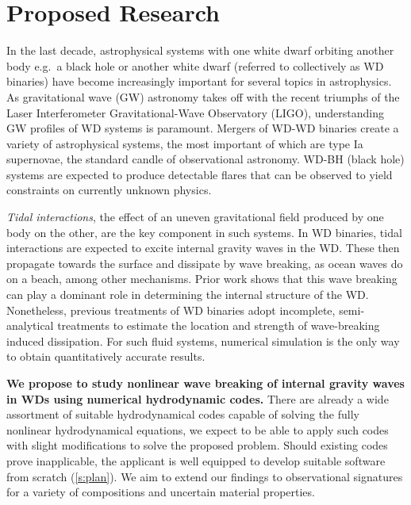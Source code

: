 \documentclass[12pt,
        usenames, %
        dvipsnames %
    ]{article}
\begin{document}
\def\Snospace~{\S{}} %
\renewcommand*{\sectionautorefname}{\Snospace}
\renewcommand*{\appendixautorefname}{\Snospace}
\renewcommand*{\figureautorefname}{Fig.}
\renewcommand*{\equationautorefname}{Eq.}
\renewcommand*{\tableautorefname}{Tab.}

\doublespacing


\section{Proposed Research}

In the last decade, astrophysical systems with one white dwarf orbiting another
body e.g.\ a black hole or another white dwarf (referred to collectively as WD
binaries) have become increasingly important for several topics in astrophysics.
As gravitational wave (GW) astronomy takes off with the recent triumphs of the
Laser Interferometer Gravitational-Wave Observatory (LIGO), understanding GW
profiles of WD systems is paramount. Mergers of WD-WD binaries create a variety
of astrophysical systems, the most important of which are type Ia supernovae,
the standard candle of observational astronomy. WD-BH (black hole) systems are
expected to produce detectable flares that can be observed to yield constraints
on currently unknown physics.

\emph{Tidal interactions}, the effect of an uneven gravitational field produced
by one body on the other, are the key component in such systems. In WD binaries,
tidal interactions are expected to excite internal gravity waves in the WD\@.
These then propagate towards the surface and dissipate by wave breaking, as ocean
waves do on a beach, among other mechanisms.
Prior work shows that this wave breaking can play a dominant role in determining
the internal structure of the WD\@. Nonetheless, previous treatments of WD
binaries adopt incomplete, semi-analytical treatments to estimate the location
and strength of wave-breaking induced dissipation. For such fluid systems,
numerical simulation is the only way to obtain quantitatively accurate results.

\textbf{We propose to study nonlinear wave breaking of internal gravity waves in
WDs using numerical hydrodynamic codes.} There are already a wide assortment of
suitable hydrodynamical codes
capable of solving the fully nonlinear hydrodynamical equations, we expect to be
able to apply such codes with slight modifications to solve the proposed
problem. Should existing codes prove inapplicable, the applicant is well
equipped to develop suitable software from scratch (\autoref{s:plan}). We aim
to extend our findings to observational signatures for a variety of compositions
and uncertain material properties.
\end{document}
